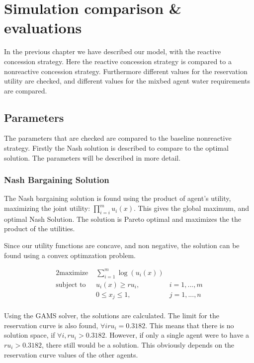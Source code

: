 \chapter{Simulation comparison \& evaluations}
In the previous chapter we have described our model, with the reactive concession strategy. Here the reactive concession strategy is compared to a nonreactive concession strategy. Furthermore different values for the reservation utility are checked, and different values for the mixbed agent water requirements are compared. 

\section{Parameters}
The parameters that are checked are compared to the baseline nonreactive strategy. Firstly the Nash solution is described to compare to the optimal solution. The parameters will be described in more detail.

\subsection{Nash Bargaining Solution}
The Nash bargaining solution is found using the product of agent's utility, maximizing the joint utility: $\prod_{i=i}^{m}u_i(x).$ This gives the global maximum, and optimal Nash Solution. The solution is Pareto optimal and maximizes the the product of the utilities. 

Since our utility functions are concave, and non negative, the solution can be found using a convex optimzation problem. 

\begin{alignat*}{2}
\text{maximize }   	& \sum_{i=1}^m \log (u_i(x))  \\
\text{subject to \ } 	& u_i(x) \geq ru_i, & i = 1,...,m\\
& 0\leq x_j\leq 1, & j = 1,...,n\\
\end{alignat*}

Using the GAMS solver, the solutions are calculated. The limit for the reservation curve is also found, $\forall i ru_i = 0.3182$. This means that there is no solution space, if $\forall i, ru_i > 0.3182$. However, if only a single agent were to have a $ru_i > 0.3182$, there still would be a solution. This obviously depends on the reservation curve values of the other agents. 

